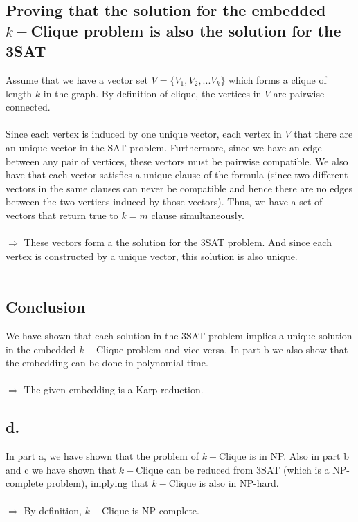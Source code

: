 \documentclass{article}
\begin{document}
\subsection*{Proving that the solution for the embedded $k-$Clique problem is also the solution for the 3SAT}
Assume that we have a vector set $V = \{V_1, V_2, ... V_k\}$ which forms a clique of length $k$ in the graph. By definition of clique, the vertices in $V$ are pairwise connected. \\\\
Since each vertex is induced by one unique vector, each vertex in $V$ that there are an unique vector in the SAT problem. Furthermore, since we have an edge between any pair of vertices, these vectors must be pairwise compatible. We also have that each vector satisfies a unique clause of the formula (since two different vectors in the same clauses can never be compatible and hence there are no edges between the two vertices induced by those vectors). Thus, we have a set of vectors that return true to $k=m$ clause simultaneously. \\\\ 
$\Rightarrow$ These vectors form a the solution for the 3SAT problem. And since each vertex is constructed by a unique vector, this solution is also unique.\\\\
\subsection*{Conclusion}
We have shown that each solution in the 3SAT problem implies a unique solution in the embedded $k-$Clique problem and vice-versa. In part b we also show that the embedding can be done in polynomial time. \\\\
$\Longrightarrow$ The given embedding is a Karp reduction.

\pagebreak
\subsection*{d.}
In part a, we have shown that the problem of $k-$Clique is in NP. Also in part b and c we have shown that $k-$Clique can be reduced from 3SAT (which is a NP-complete problem), implying that $k-$Clique is also in NP-hard. \\\\
$\Rightarrow$ By definition, $k-$Clique is NP-complete.
\end{document}
